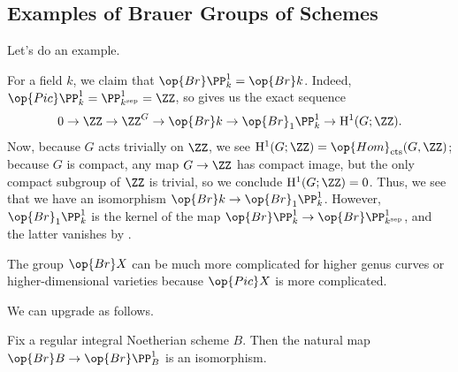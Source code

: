 \documentclass[../notes.tex]{subfiles}
\begin{document}
\subsection{Examples of Brauer Groups of Schemes} \label{subsec:brauer-computations}
Let's do an example.
\begin{example} \label{ex:br-p1-field}
	For a field $k$, we claim that $\op{Br}\PP^1_k=\op{Br}k$. Indeed, $\op{Pic}\PP^1_k=\PP^1_{k^{\mathrm{sep}}}=\ZZ$, so  gives us the exact sequence
	\[0\to\ZZ\to\ZZ^G\to\op{Br}k\to\op{Br}_1\PP^1_k\to\mathrm H^1(G;\ZZ).\]
	Now, because $G$ acts trivially on $\ZZ$, we see $\mathrm H^1(G;\ZZ)=\op{Hom}_{\mathrm{cts}}(G,\ZZ)$; because $G$ is compact, any map $G\to\ZZ$ has compact image, but the only compact subgroup of $\ZZ$ is trivial, so we conclude $\mathrm H^1(G;\ZZ)=0$. Thus, we see that we have an isomorphism $\op{Br}k\to\op{Br}_1\PP^1_k$. However, $\op{Br}_1\PP^1_k$ is the kernel of the map $\op{Br}\PP^1_k\to\op{Br}\PP^1_{k^{\mathrm{sep}}}$, and the latter vanishes by .
\end{example}
\begin{remark}
	The group $\op{Br}X$ can be much more complicated for higher genus curves or higher-dimensional varieties because $\op{Pic}X$ is more complicated.
\end{remark}
We can upgrade  as follows.
\begin{proposition} \label{prop:br-relative-p1}
	Fix a regular integral Noetherian scheme $B$. Then the natural map $\op{Br}B\to\op{Br}\PP^1_B$ is an isomorphism.
\end{proposition}
\end{document}

